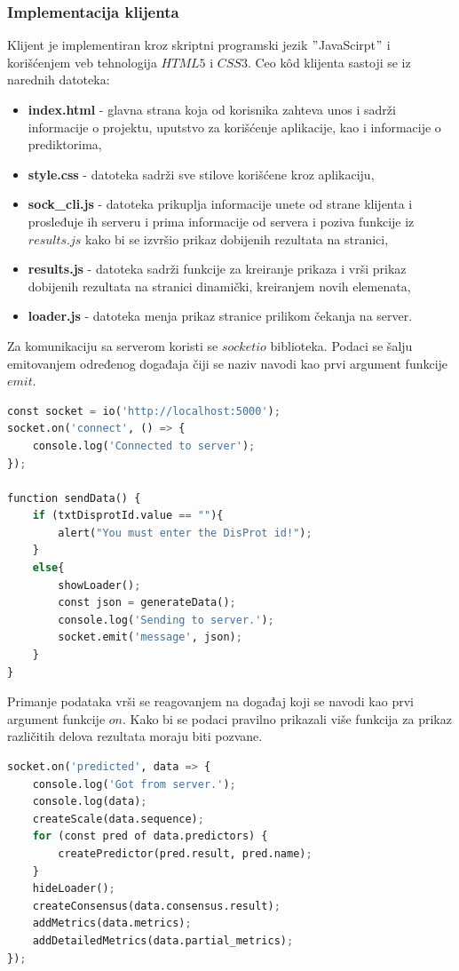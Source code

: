 \subsubsection{Implementacija klijenta}
Klijent je implementiran kroz skriptni programski jezik $"$JavaScirpt$"$ i korišćenjem veb tehnologija $HTML5$ i $CSS3$. 
Ceo kôd klijenta sastoji se iz narednih datoteka:
\begin{itemize}
\item \textbf{index.html} - glavna strana koja od korisnika zahteva unos i sadrži informacije o projektu, uputstvo za korišćenje aplikacije, kao i informacije o prediktorima,
\item \textbf{style.css} - datoteka sadrži sve stilove korišćene kroz aplikaciju,
\item \textbf{sock\_cli.js} - datoteka prikuplja informacije unete od strane klijenta i prosleđuje ih serveru i prima informacije od servera i poziva funkcije iz $results.js$ kako bi se izvršio prikaz dobijenih rezultata na stranici,
\item \textbf{results.js} - datoteka sadrži funkcije za kreiranje prikaza i vrši prikaz dobijenih rezultata na stranici dinamički, kreiranjem novih elemenata, 
\item \textbf{loader.js} - datoteka menja prikaz stranice prilikom čekanja na server.
\end{itemize}

Za komunikaciju sa serverom koristi se $socketio$ biblioteka. Podaci se šalju emitovanjem određenog događaja čiji se naziv navodi kao prvi argument funkcije $emit$.
\begin{lstlisting}[language=Python]
const socket = io('http://localhost:5000');
socket.on('connect', () => {
    console.log('Connected to server');
});

function sendData() {
    if (txtDisprotId.value == ""){
        alert("You must enter the DisProt id!");
    }
    else{
        showLoader();
        const json = generateData();
        console.log('Sending to server.');
        socket.emit('message', json);
    }
}
\end{lstlisting}

Primanje podataka vrši se reagovanjem na događaj koji se navodi kao prvi argument funkcije $on$. Kako bi se podaci pravilno prikazali  više funkcija za prikaz različitih delova rezultata moraju biti pozvane.

\begin{lstlisting}[language=Python]
socket.on('predicted', data => {
    console.log('Got from server.');
    console.log(data);
    createScale(data.sequence);
    for (const pred of data.predictors) {
        createPredictor(pred.result, pred.name);
    }
    hideLoader(); 
    createConsensus(data.consensus.result);
    addMetrics(data.metrics);
    addDetailedMetrics(data.partial_metrics);
});
\end{lstlisting} 

